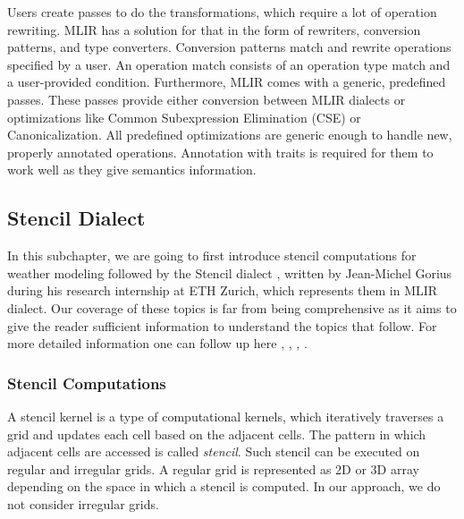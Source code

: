 \documentclass[sigplan,\review anonymous]{acmart}
\begin{document}
Users create passes to do the transformations, which require a lot of operation
rewriting. MLIR has a solution for that in the form of rewriters, conversion
patterns, and type converters. Conversion patterns match and rewrite operations
specified by a user. An operation match consists of an operation type match and
a user-provided condition. Furthermore, MLIR comes with a generic, predefined
passes. These passes provide either conversion between MLIR dialects or
optimizations like Common Subexpression Elimination (CSE) or Canonicalization.
All predefined optimizations are generic enough to handle new, properly
annotated operations. Annotation with traits is required for them to work well
as they give semantics information.

\subsection{Stencil Dialect}
In this subchapter, we are going to first introduce stencil computations for
weather modeling followed by the Stencil dialect \cite{jmgorius1},
\cite{jmgorius2} written by Jean-Michel Gorius during his research internship
at ETH Zurich, which represents them in MLIR dialect. Our coverage of these
topics is far from being comprehensive as it aims to give the reader sufficient
information to understand the topics that follow. For more detailed information
one can follow up here \cite{Roth97compilingstencils}, \cite{Holewinski},
\cite{jmgorius1}, \cite{jmgorius2}.

\subsubsection{Stencil Computations}

A stencil kernel is a type of computational kernels, which iteratively
traverses a grid and updates each cell based on the adjacent cells.
The pattern in which adjacent cells are accessed is called \textit{stencil}.
Such stencil can be executed on regular \cite{bianco2012generic} and irregular
\cite{irregular} grids. A regular grid is represented as 2D or 3D array
depending on the space in which a stencil is computed. In our approach, we
do not consider irregular grids.
\end{document}
